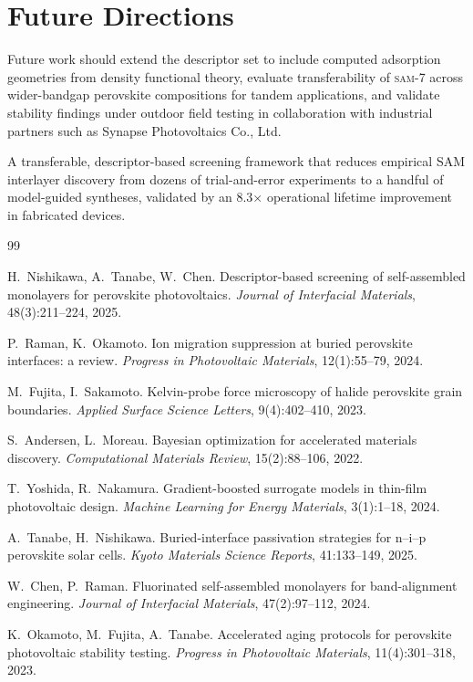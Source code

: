 \documentclass[12pt,a4paper,oneside]{report}
\begin{document}
\section{Future Directions}

Future work should extend the descriptor set to include computed
adsorption geometries from density functional theory, evaluate
transferability of \textsc{sam-7} across wider-bandgap perovskite
compositions for tandem applications, and validate stability findings
under outdoor field testing in collaboration with industrial partners
such as Synapse Photovoltaics Co., Ltd.

\begin{keybox}[title=Key Contribution]
A transferable, descriptor-based screening framework that reduces
empirical SAM interlayer discovery from dozens of trial-and-error
experiments to a handful of model-guided syntheses, validated by an
8.3$\times$ operational lifetime improvement in fabricated devices.
\end{keybox}

\begin{thebibliography}{99}

 H.\ Nishikawa, A.\ Tanabe, W.\ Chen. Descriptor-based
  screening of self-assembled monolayers for perovskite photovoltaics.
  \textit{Journal of Interfacial Materials}, 48(3):211--224, 2025.

 P.\ Raman, K.\ Okamoto. Ion migration suppression at
  buried perovskite interfaces: a review. \textit{Progress in
  Photovoltaic Materials}, 12(1):55--79, 2024.

 M.\ Fujita, I.\ Sakamoto. Kelvin-probe force microscopy of
  halide perovskite grain boundaries. \textit{Applied Surface Science
  Letters}, 9(4):402--410, 2023.

 S.\ Andersen, L.\ Moreau. Bayesian optimization for
  accelerated materials discovery. \textit{Computational Materials
  Review}, 15(2):88--106, 2022.

 T.\ Yoshida, R.\ Nakamura. Gradient-boosted surrogate
  models in thin-film photovoltaic design. \textit{Machine Learning for
  Energy Materials}, 3(1):1--18, 2024.

 A.\ Tanabe, H.\ Nishikawa. Buried-interface passivation
  strategies for n--i--p perovskite solar cells. \textit{Kyoto Materials
  Science Reports}, 41:133--149, 2025.

 W.\ Chen, P.\ Raman. Fluorinated self-assembled
  monolayers for band-alignment engineering. \textit{Journal of
  Interfacial Materials}, 47(2):97--112, 2024.

 K.\ Okamoto, M.\ Fujita, A.\ Tanabe. Accelerated aging
  protocols for perovskite photovoltaic stability testing.
  \textit{Progress in Photovoltaic Materials}, 11(4):301--318, 2023.

\end{thebibliography}
\end{document}
